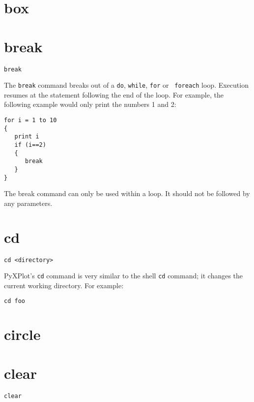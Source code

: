 \section{box}


\section{break}

\begin{verbatim}
break
\end{verbatim}

The {\tt break} command breaks out of a {\tt do}, {\tt while}, {\tt for} or {\tt
foreach} loop.  Execution resumes at the statement following the end of the
loop.  For example, the following example would only print the numbers 1 and 2:

\begin{verbatim}
for i = 1 to 10
{
   print i
   if (i==2)
   {
      break
   }
}
\end{verbatim}

The break command can only be used within a loop.  It should not be followed by
any parameters.


\section{cd}

\begin{verbatim}
cd <directory>
\end{verbatim}

PyXPlot's {\tt cd} command is very similar to the shell {\tt cd} command; it
changes the current working directory. For example:

\begin{verbatim}
cd foo
\end{verbatim}


\section{circle}


\section{clear}

\begin{verbatim}
clear
\end{verbatim}

